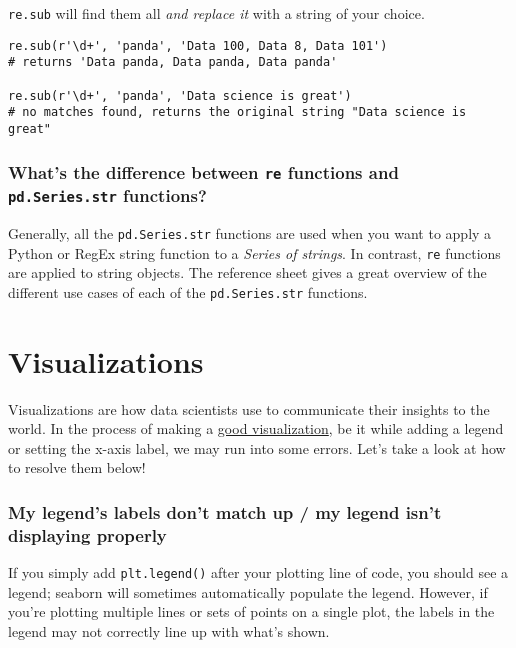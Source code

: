 \documentclass[
  letterpaper,
  DIV=11,
  numbers=noendperiod]{scrreprt}
\begin{document}
\texttt{re.sub} will find them all \emph{and replace it} with a string
of your choice.

\begin{verbatim}
re.sub(r'\d+', 'panda', 'Data 100, Data 8, Data 101') 
# returns 'Data panda, Data panda, Data panda'

re.sub(r'\d+', 'panda', 'Data science is great')  
# no matches found, returns the original string "Data science is great" 
\end{verbatim}

\subsection{\texorpdfstring{What's the difference between \texttt{re}
functions and \texttt{pd.Series.str}
functions?}{What's the difference between re functions and pd.Series.str functions?}}\label{whats-the-difference-between-re-functions-and-pd.series.str-functions}

Generally, all the \texttt{pd.Series.str} functions are used when you
want to apply a Python or RegEx string function to a \emph{Series of
strings}. In contrast, \texttt{re} functions are applied to string
objects. The reference sheet gives a great overview of the different use
cases of each of the \texttt{pd.Series.str} functions.


\chapter{Visualizations}\label{visualizations}

Visualizations are how data scientists use to communicate their insights
to the world. In the process of making a
\href{https://ds100.org/course-notes/visualization_2/visualization_2.html\#harnessing-context}{good
visualization}, be it while adding a legend or setting the x-axis label,
we may run into some errors. Let's take a look at how to resolve them
below!

\subsection{My legend's labels don't match up / my legend isn't
displaying
properly}\label{my-legends-labels-dont-match-up-my-legend-isnt-displaying-properly}

If you simply add \texttt{plt.legend()} after your plotting line of
code, you should see a legend; seaborn will sometimes automatically
populate the legend. However, if you're plotting multiple lines or sets
of points on a single plot, the labels in the legend may not correctly
line up with what's shown.
\end{document}
